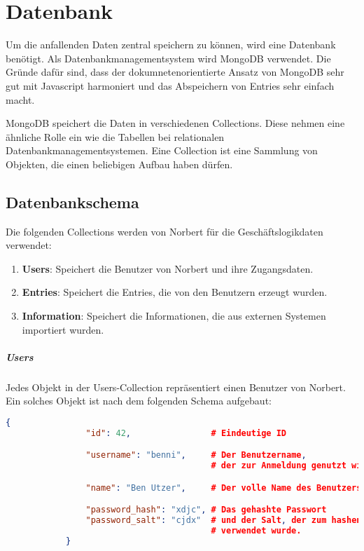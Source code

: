 
\chapter{Datenbank}

Um die anfallenden Daten zentral speichern zu können, wird eine Datenbank benötigt. Als Datenbankmanagementsystem wird MongoDB verwendet. Die Gründe dafür sind, dass der dokumnetenorientierte Ansatz von MongoDB sehr gut mit Javascript harmoniert und das Abspeichern von Entries sehr einfach macht.

MongoDB speichert die Daten in verschiedenen Collections. Diese nehmen eine ähnliche Rolle ein wie die Tabellen bei relationalen Datenbankmanagementsystemen. Eine Collection ist eine Sammlung von Objekten, die einen beliebigen Aufbau haben dürfen.

\section{Datenbankschema} %
\label{sec:datenbankschema}

	Die folgenden Collections werden von Norbert für die Geschäftslogikdaten verwendet:

	\begin{enumerate}
		\item \textbf{Users}: Speichert die Benutzer von Norbert und ihre Zugangsdaten.
		\item \textbf{Entries}: Speichert die Entries, die von den Benutzern erzeugt wurden.
		\item \textbf{Information}: Speichert die Informationen, die aus externen Systemen importiert wurden.
	\end{enumerate}

	\paragraph{Users} %
	\label{par:users}

		Jedes Objekt in der Users-Collection repräsentiert einen Benutzer von Norbert. Ein solches Objekt ist nach dem folgenden Schema aufgebaut:

		\begin{lstlisting}[language=JSON]
			{
				"id": 42,                # Eindeutige ID

				"username": "benni",     # Der Benutzername, 
				                         # der zur Anmeldung genutzt wird.

				"name": "Ben Utzer",     # Der volle Name des Benutzers

				"password_hash": "xdjc", # Das gehashte Passwort
				"password_salt": "cjdx"  # und der Salt, der zum hashen des Passworts 
				                         # verwendet wurde.
			}
		\end{lstlisting}
